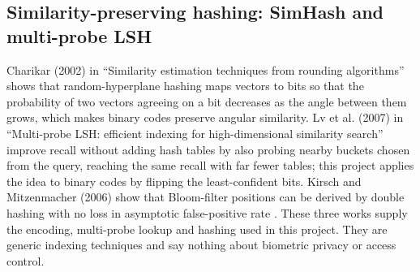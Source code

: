 \documentclass[12pt,a4paper,oneside]{report}
\begin{document}
\subsection{Similarity-preserving hashing: SimHash and multi-probe LSH}
Charikar (2002) in ``Similarity estimation techniques from rounding algorithms'' \cite{ref14} shows that random-hyperplane hashing maps vectors to bits so that the probability of two vectors agreeing on a bit decreases as the angle between them grows, which makes binary codes preserve angular similarity. Lv et al. (2007) in ``Multi-probe LSH: efficient indexing for high-dimensional similarity search'' \cite{ref15} improve recall without adding hash tables by also probing nearby buckets chosen from the query, reaching the same recall with far fewer tables; this project applies the idea to binary codes by flipping the least-confident bits. Kirsch and Mitzenmacher (2006) show that Bloom-filter positions can be derived by double hashing with no loss in asymptotic false-positive rate \cite{ref16}. These three works supply the encoding, multi-probe lookup and hashing used in this project. They are generic indexing techniques and say nothing about biometric privacy or access control.
\end{document}
